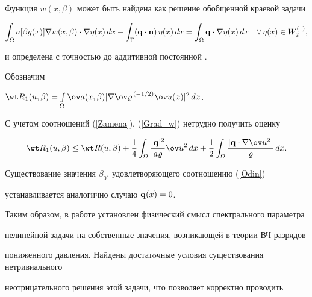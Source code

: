 \begin{pf}
Функция $w(x, \beta)$ может быть найдена как решение обобщенной краевой задачи 


$$


\int_\Omega a[ \beta g(x) ] \nabla w(x, \beta)\cdot \nabla


\eta (x) \, dx -


\int_\Gamma ({\bold q } \cdot {\bold n}) \,\eta (x) \, dx = 


\int_\Omega {\bold q } \cdot \nabla \eta (x) \, dx


\quad \forall \, \eta (x)\in W_2^{(1)},


$$


и определена с точностью до аддитивной постоянной \cite{Lad}.





Обозначим


$\wt R_1(u,\beta )=\int\limits_\Omega


\ov a (x, \beta ) | \nabla {\ov \varrho}^{\,(-1/2)}


\ov u(x) |^2\, dx$.


С учетом соотношений (\ref{Zamena}), (\ref{Grad_w}) нетрудно получить оценку 


$$


\wt R_1(u,\beta ) \le \wt R (u,\beta ) + 


\frac{1}{4}\int_\Omega


\frac{| {\bold q} |^2}{a \varrho} \ov u^2\, dx +


\frac{1}{2}\int_\Omega


\frac{| {\bold q} \cdot \nabla \ov u^2 |}{\varrho} \, dx.


$$





Существование значения $\beta_0$, удовлетворяющего соотношению (\ref{Odin})


устанавливается аналогично случаю ${\bold q}(x)=0$.


\end{pf}





Таким образом, в работе установлен физический смысл спектрального параметра


нелинейной задачи на собственные значения, возникающей в теории ВЧ разрядов


пониженного давления. Найдены достатoчные условия существования нетривиального


неотрицательного решения этой задачи, что позволяет корректно проводить



